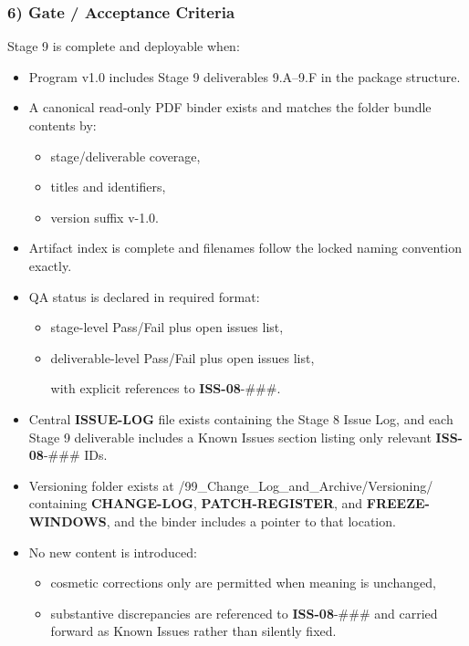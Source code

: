 \documentclass[10pt]{article}
\begin{document}
\subsubsection*{6) Gate / Acceptance Criteria}

Stage 9 is complete and deployable when:

\begin{itemize}
\item Program v1.0 includes Stage 9 deliverables 9.A–9.F in the package structure.
\item A canonical read-only PDF binder exists and matches the folder bundle contents by:
  \begin{itemize}
  \item stage/deliverable coverage,
  \item titles and identifiers,
  \item version suffix v-1.0.
  \end{itemize}
\item Artifact index is complete and filenames follow the locked naming convention exactly.
\item QA status is declared in required format:
  \begin{itemize}
  \item stage-level Pass/Fail plus open issues list,
  \item deliverable-level Pass/Fail plus open issues list,
  
  with explicit references to \textbf{ISS-08}-\#\#\#.
  \end{itemize}
\item Central \textbf{ISSUE-LOG} file exists containing the Stage 8 Issue Log, and each Stage 9 deliverable includes a Known Issues section listing only relevant \textbf{ISS-08}-\#\#\# IDs.
\item Versioning folder exists at /99\_Change\_Log\_and\_Archive/Versioning/ containing \textbf{CHANGE-LOG}, \textbf{PATCH-REGISTER}, and \textbf{FREEZE-WINDOWS}, and the binder includes a pointer to that location.
\item No new content is introduced:
  \begin{itemize}
  \item cosmetic corrections only are permitted when meaning is unchanged,
  \item substantive discrepancies are referenced to \textbf{ISS-08}-\#\#\# and carried forward as Known Issues rather than silently fixed.
  \end{itemize}
\end{itemize}
\end{document}
